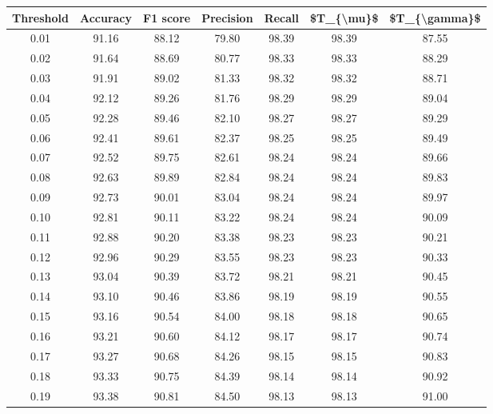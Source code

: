 \begin{tabular}{|c|c|c|c|c|c|c|}
\hline
 Threshold &  Accuracy &  F1 score &  Precision &  Recall &  \$T\_\{\textbackslash mu\}\$ &  \$T\_\{\textbackslash gamma\}\$ \\
\hline
      0.01 &     91.16 &     88.12 &      79.80 &   98.39 &      98.39 &         87.55 \\
      0.02 &     91.64 &     88.69 &      80.77 &   98.33 &      98.33 &         88.29 \\
      0.03 &     91.91 &     89.02 &      81.33 &   98.32 &      98.32 &         88.71 \\
      0.04 &     92.12 &     89.26 &      81.76 &   98.29 &      98.29 &         89.04 \\
      0.05 &     92.28 &     89.46 &      82.10 &   98.27 &      98.27 &         89.29 \\
      0.06 &     92.41 &     89.61 &      82.37 &   98.25 &      98.25 &         89.49 \\
      0.07 &     92.52 &     89.75 &      82.61 &   98.24 &      98.24 &         89.66 \\
      0.08 &     92.63 &     89.89 &      82.84 &   98.24 &      98.24 &         89.83 \\
      0.09 &     92.73 &     90.01 &      83.04 &   98.24 &      98.24 &         89.97 \\
      0.10 &     92.81 &     90.11 &      83.22 &   98.24 &      98.24 &         90.09 \\
      0.11 &     92.88 &     90.20 &      83.38 &   98.23 &      98.23 &         90.21 \\
      0.12 &     92.96 &     90.29 &      83.55 &   98.23 &      98.23 &         90.33 \\
      0.13 &     93.04 &     90.39 &      83.72 &   98.21 &      98.21 &         90.45 \\
      0.14 &     93.10 &     90.46 &      83.86 &   98.19 &      98.19 &         90.55 \\
      0.15 &     93.16 &     90.54 &      84.00 &   98.18 &      98.18 &         90.65 \\
      0.16 &     93.21 &     90.60 &      84.12 &   98.17 &      98.17 &         90.74 \\
      0.17 &     93.27 &     90.68 &      84.26 &   98.15 &      98.15 &         90.83 \\
      0.18 &     93.33 &     90.75 &      84.39 &   98.14 &      98.14 &         90.92 \\
      0.19 &     93.38 &     90.81 &      84.50 &   98.13 &      98.13 &         91.00 \\

\end{tabular}

